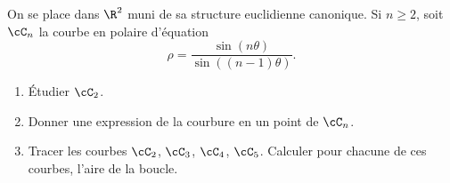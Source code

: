 \begin{enonce}
\begin{exercise}[ID={RMS 122-2 E1124 Centrale PC},subtitle={},tags={}, difficulty={0}]
On se place dans $\R^2$ muni de sa structure euclidienne canonique.
Si $n\geq 2$, soit $\cC_n$ la courbe en polaire d'équation
\begin{equation*}
  \rho = \frac{\sin(n\theta)}{\sin\left( (n-1)\theta \right)}.
\end{equation*}
\begin{enumerate}
  \item Étudier $\cC_2$.
  \item Donner une expression de la courbure en un point de $\cC_n$.
  \item Tracer les courbes $\cC_2$, $\cC_3$, $\cC_4$, $\cC_5$.
    Calculer pour chacune de ces courbes, l'aire de la boucle.
\end{enumerate}
\end{exercise}
\begin{solution}
\end{solution}
\end{enonce}
